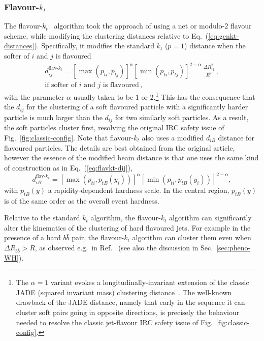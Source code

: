 \documentclass[nofootinbib,twocolumn,preprintnumbers,superscriptaddress,aps]{revtex4-2}
\begin{document}
\subsubsection{Flavour-$k_t$}
The flavour-$k_t$~\cite{Banfi:2006hf} algorithm took the approach
of using a net or modulo-$2$ flavour scheme,
while modifying the clustering
distances relative to Eq.~(\ref{eq:genkt-distances}).
%
Specifically, it modifies the standard $k_t$ ($p=1$) distance when the
softer of $i$ and $j$ is flavoured
\begin{multline}
  \label{eq:flavkt-dij}
  d_{ij}^\text{flav-$k_t$} =  
  [\max(p_{ti},p_{tj})]^{\alpha} [\min(p_{ti},p_{tj})]^{2-\alpha}
  \,\frac{\Delta R_{ij}^2}{R^2}\,,
  \\
  \text{if softer of $i$ and $j$ is flavoured}\,,
\end{multline}
with the parameter $\alpha$ usually taken to be $1$ or
$2$.\footnote{The $\alpha=1$ variant evokes a
  longitudinally-invariant extension of the classic JADE (squared invariant
  mass) clustering distance~\cite{JADE:1986kta,JADE:1988xlj}.
  The well-known drawback of the JADE distance, namely that early in
  the sequence it can cluster soft pairs going in opposite directions,
  is precisely the behaviour needed to resolve the classic jet-flavour
  IRC safety issue of Fig.~\ref{fig:classic-config}. }
% 
This has the consequence that the $d_{ij}$ for the clustering of a soft
flavoured particle with a significantly harder particle is much larger
than the $d_{ij}$ for two similarly soft particles.
%
As a result, the soft particles cluster first, resolving the original
IRC safety issue of Fig.~\ref{fig:classic-config}.
%
Note that flavour-$k_t$ also uses a modified $d_{iB}$ distance for
flavoured particles.
%
The details are best obtained from the original article, however the
essence of the modified beam distance is that one uses the same kind
of construction as in Eq.~(\ref{eq:flavkt-dij}),
\begin{equation}
  \label{eq:flavkt-diB-main-text}
  d_{iB}^\text{flav-$k_t$}  = [\max(p_{ti},p_{tB}(y_i))]^{\alpha} [\min(p_{ti},p_{tB}(y_i))]^{2-\alpha},
\end{equation}
with $p_{tB}(y)$ a rapidity-dependent hardness scale.
%
In the central region, $p_{tB}(y)$ is of the same order as the overall
event hardness.

Relative to the standard $k_t$ algorithm, the flavour-$k_t$ algorithm
can significantly alter the kinematics of the clustering of hard
flavoured jets.
%
For example in the presence of a hard $b\bar b$ pair, the
flavour-$k_t$ algorithm can cluster them even when
$\Delta R_{b\bar b} > R$, as observed e.g.\ in
Ref.~\cite{Behring:2020uzq} (see also the discussion in
Sec.~\ref{sec:pheno-WH}).
\end{document}
